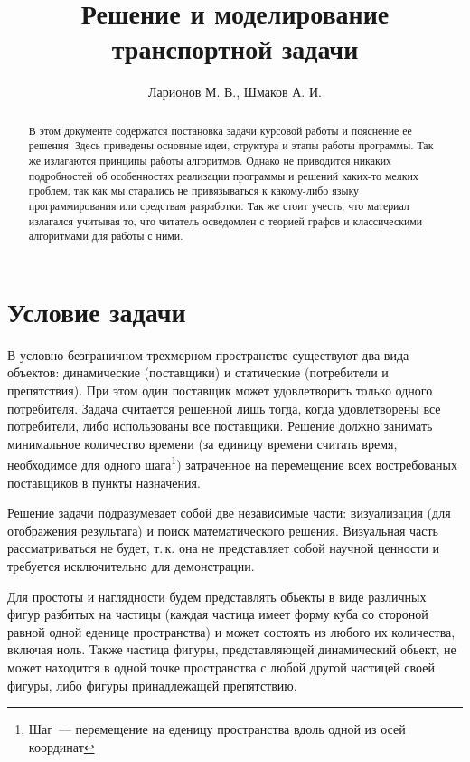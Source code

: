 \documentclass[a4paper,10pt]{article}
\title{Решение и моделирование транспортной задачи}
\author{Ларионов М. В., Шмаков А. И.}
\begin{document}
\maketitle

\newpage

\begin{abstract}
 В этом документе содержатся постановка задачи курсовой работы
и пояснение ее решения. Здесь приведены основные идеи,
структура и этапы работы программы. Так же излагаются
принципы работы алгоритмов. Однако не приводится никаких подробностей об
особенностях реализации программы и решений каких-то мелких проблем,
так как мы старались не привязываться к какому-либо языку программирования
или средствам разработки. Так же стоит учесть, что материал излагался
учитывая то, что читатель осведомлен с теорией графов и
классическими алгоритмами для работы с ними.
\end{abstract}

\newpage

\section{Условие задачи}
 В условно безграничном трехмерном пространстве существуют два вида объектов:
динамические (поставщики) и статические (потребители и препятствия). При этом
один поставщик может удовлетворить только одного потребителя. Задача считается
решенной лишь тогда, когда удовлетворены все потребители, либо использованы все
поставщики. Решение должно занимать минимальное количество времени (за единицу времени
считать время, необходимое для одного шага\footnote{Шаг~--- перемещение на
еденицу пространства вдоль одной из осей координат}) затраченное на перемещение
всех востребованых поставщиков в пункты назначения.

Решение задачи подразумевает собой две
независимые части: визуализация (для отображения результата)
и поиск математического решения. Визуальная часть рассматриваться не будет,
т.\,к. она не представляет собой научной ценности и требуется исключительно
для демонстрации. %

Для простоты и наглядности будем представлять обьекты в виде различных фигур
разбитых на частицы (каждая частица имеет форму куба со стороной равной
одной еденице пространства) и может состоять из любого их количества, включая ноль.
Также частица фигуры, представляющей динамический обьект, не может находится
в одной точке пространства с любой другой частицей своей фигуры, либо
фигуры принадлежащей препятствию.
\end{document}
